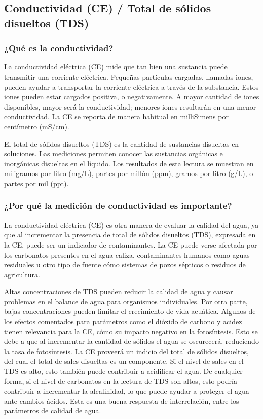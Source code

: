 \subsection{Conductividad (CE) / Total de sólidos disueltos (TDS)}

\subsubsection{¿Qué es la conductividad?}
La conductividad eléctrica (CE) mide que tan bien una sustancia puede transmitir una corriente eléctrica. 
Pequeñas partículas cargadas, llamadas iones, pueden ayudar a transportar la corriente eléctrica a través de la substancia. 
Estos iones pueden estar cargados positiva, o negativamente. A mayor cantidad de iones disponibles, mayor será la conductividad; menores iones resultarán en una menor conductividad. 
La CE se reporta de manera habitual en milliSimens por centímetro (mS/cm).

El total de sólidos disueltos (TDS) es la cantidad de sustancias disueltas en soluciones. 
Las mediciones permiten conocer las sustancias orgánicas e inorgánicas disueltas en el líquido. 
Los resultados de esta lectura se muestran en miligramos por litro (mg/L), partes por mill\'on (ppm), gramos por litro (g/L), o partes por mil (ppt).

\subsubsection{¿Por qu\'e la medici\'on de conductividad es importante?}
La conductividad eléctrica (CE) es otra manera de evaluar la calidad del agua, ya que al incrementar la presencia de total de sólidos disueltos (TDS), expresada en la CE, puede ser un indicador de contaminantes. 
La CE puede verse afectada por los carbonatos presentes en el agua caliza, contaminantes humanos como aguas residuales u otro tipo de fuente cómo sistemas de pozos sépticos o residuos de agricultura.

Altas concentraciones de TDS pueden reducir la calidad de agua y causar problemas en el balance de agua para organismos individuales. 
Por otra parte, bajas concentraciones pueden limitar el crecimiento de vida acuática. 
Algunos de los efectos comentados para parámetros como el dióxido de carbono y acidez tienen relevancia para la CE, cómo su impacto negativo en la fotosíntesis. 
Esto se debe a que al incrementar la cantidad de sólidos el agua se oscurecerá, reduciendo la tasa de fotosíntesis. 
La CE proveerá un indicio del total de sólidos disueltos, del cual el total de sales disueltas es un componente. 
Si el nivel de sales en el TDS es alto, esto también puede contribuir a acidificar el agua. 
De cualquier forma, si el nivel de carbonatos en la lectura de TDS son altos, esto podría contribuir a incrementar la alcalinidad, lo que puede ayudar a proteger el agua ante cambios ácidos. 
Esta es una buena respuesta de interrelación, entre los parámetros de calidad de agua.

